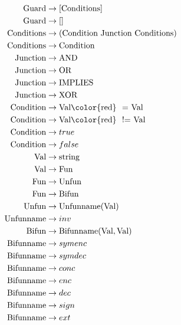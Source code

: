 \documentclass[12pt,journal,compsoc]{IEEEtran}
\begin{document}
\begin{small}
\begin{align*}
	\text{Guard} 			&\rightarrow [ \text{Conditions} ]							\\
	\text{Guard} 			&\rightarrow []											\\
	\text{Conditions} 		&\rightarrow (\text{Condition}\ \text{Junction}\ \text{Conditions})	\\
	\text{Conditions} 		&\rightarrow \text{Condition}								\\
	\text{Junction}		&\rightarrow \text{AND} \\
	\text{Junction}		&\rightarrow \text{OR} \\
	\text{Junction}		&\rightarrow \text{IMPLIES} \\
	\text{Junction}		&\rightarrow \text{XOR} \\
	\text{Condition}		&\rightarrow \text{Val} \text{\color{red} \ = } \text{Val} 				\\
	\text{Condition}		&\rightarrow \text{Val} \text{\color{red} \ != } \text{Val} 				\\
	\text{Condition}		&\rightarrow true 											\\
	\text{Condition}		&\rightarrow false											\\
	\text{Val}    		&\rightarrow \text{string}									\\
	\text{Val}    		&\rightarrow \text{Fun}									\\
	\text{Fun}  			&\rightarrow \text{Unfun}									\\
	\text{Fun}  			&\rightarrow \text{Bifun}									\\
	\text{Unfun}			&\rightarrow \text{Unfunname} ( \text{Val} )					\\
	\text{Unfunname}		&\rightarrow inv											\\
	\text{Bifun}			&\rightarrow \text{Bifunname} ( \text{Val} , \text{Val} )		\\
	\text{Bifunname}		&\rightarrow symenc 										\\
	\text{Bifunname}		&\rightarrow symdec 										\\
	\text{Bifunname}		&\rightarrow conc 											\\
	\text{Bifunname}		&\rightarrow enc											\\
	\text{Bifunname}		&\rightarrow dec 											\\
	\text{Bifunname}		&\rightarrow sign											\\
	\text{Bifunname}		&\rightarrow ext		
\end{align*}
\end{small}
\end{document}
